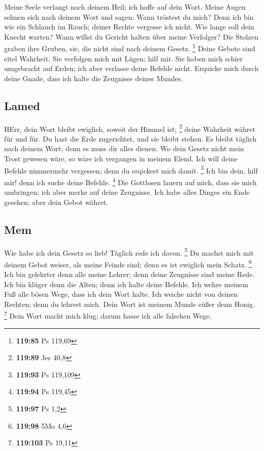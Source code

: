  Meine Seele verlangt nach deinem Heil; ich hoffe auf
dein Wort.  Meine Augen sehnen sich nach deinem Wort und
sagen: Wann tröstest du mich?  Denn ich bin wie ein
Schlauch im Rauch; deiner Rechte vergesse ich nicht.  Wie
lange soll dein Knecht warten? Wann willst du Gericht halten über meine
Verfolger?  Die Stolzen graben ihre Gruben, sie, die
nicht sind nach deinem Gesetz. \footnote{\textbf{119:85} Ps 119,69}
 Deine Gebote sind eitel Wahrheit. Sie verfolgen mich mit
Lügen; hilf mir.  Sie haben mich schier umgebracht auf
Erden; ich aber verlasse deine Befehle nicht.  Erquicke
mich durch deine Gnade, dass ich halte die Zeugnisse deines Mundes.

\hypertarget{lamed}{%
\subsection{Lamed}\label{lamed}}

 HErr, dein Wort bleibt ewiglich, soweit der Himmel ist;
\footnote{\textbf{119:89} Jes 40,8}  deine Wahrheit
währet für und für. Du hast die Erde zugerichtet, und sie bleibt stehen.
 Es bleibt täglich nach deinem Wort; denn es muss dir
alles dienen.  Wo dein Gesetz nicht mein Trost gewesen
wäre, so wäre ich vergangen in meinem Elend.  Ich will
deine Befehle nimmermehr vergessen; denn du erqickest mich damit.
\footnote{\textbf{119:93} Ps 119,109}  Ich bin dein, hilf
mir! denn ich suche deine Befehle. \footnote{\textbf{119:94} Ps 119,45}
 Die Gottlosen lauern auf mich, dass sie mich umbringen;
ich aber merke auf deine Zeugnisse.  Ich habe alles
Dinges ein Ende gesehen; aber dein Gebot währet.

\hypertarget{mem}{%
\subsection{Mem}\label{mem}}

 Wie habe ich dein Gesetz so lieb! Täglich rede ich
davon. \footnote{\textbf{119:97} Ps 1,2}  Du machst mich
mit deinem Gebot weiser, als meine Feinde sind; denn es ist ewiglich
mein Schatz. \footnote{\textbf{119:98} 5Mo 4,6}  Ich bin
gelehrter denn alle meine Lehrer; denn deine Zeugnisse sind meine Rede.
 Ich bin klüger denn die Alten; denn ich halte deine
Befehle.  Ich wehre meinem Fuß alle bösen Wege, dass ich
dein Wort halte.  Ich weiche nicht von deinen Rechten;
denn du lehrest mich.  Dein Wort ist meinem Munde süßer
denn Honig. \footnote{\textbf{119:103} Ps 19,11}  Dein
Wort macht mich klug; darum hasse ich alle falschen Wege.

